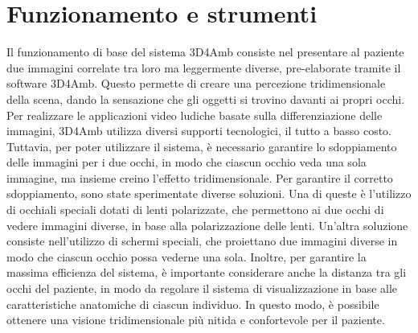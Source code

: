 \documentclass[
a4paper,
cleardoublepage=empty,
headings=twolinechapter,
numbers=autoenddot,
]{scrbook}
\begin{document}
	\section{Funzionamento e strumenti}
	Il funzionamento di base del sistema 3D4Amb consiste nel presentare al paziente due immagini correlate tra loro ma leggermente diverse, pre-elaborate tramite il software 3D4Amb. Questo permette di creare una percezione tridimensionale della scena, dando la sensazione che gli oggetti si trovino davanti ai propri occhi.
	Per realizzare le applicazioni video ludiche basate sulla differenziazione delle immagini, 3D4Amb utilizza diversi supporti tecnologici, il tutto a basso costo. Tuttavia, per poter utilizzare il sistema, è necessario garantire lo sdoppiamento delle immagini per i due occhi, in modo che ciascun occhio veda una sola immagine, ma insieme creino l'effetto tridimensionale.
	Per garantire il corretto sdoppiamento, sono state sperimentate diverse soluzioni. Una di queste è l'utilizzo di occhiali speciali dotati di lenti polarizzate, che permettono ai due occhi di vedere immagini diverse, in base alla polarizzazione delle lenti. Un'altra soluzione consiste nell'utilizzo di schermi speciali, che proiettano due immagini diverse in modo che ciascun occhio possa vederne una sola.
	Inoltre, per garantire la massima efficienza del sistema, è importante considerare anche la distanza tra gli occhi del paziente, in modo da regolare il sistema di visualizzazione in base alle caratteristiche anatomiche di ciascun individuo. In questo modo, è possibile ottenere una visione tridimensionale più nitida e confortevole per il paziente.
\end{document}
